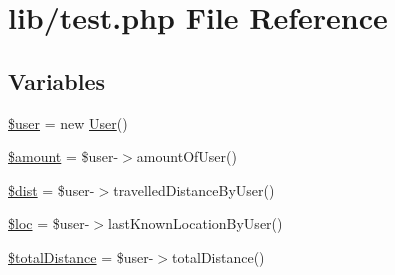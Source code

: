 \hypertarget{test_8php}{\section{lib/test.php File Reference}
\label{test_8php}
}
\subsection*{Variables}
\begin{DoxyCompactItemize}
\item 
\hyperlink{test_8php_a598ca4e71b15a1313ec95f0df1027ca5}{\$user} = new \hyperlink{class_user}{User}()
\item 
\hyperlink{test_8php_af48fe050f529b6ca56356299183b7778}{\$amount} = \$user-\/$>$amount\-Of\-User()
\item 
\hyperlink{test_8php_a2c65ce87b20f770bf48c5f6c585ec4a5}{\$dist} = \$user-\/$>$travelled\-Distance\-By\-User()
\item 
\hyperlink{test_8php_a5b64ac9a38b866d891fcb47ca45c0b3d}{\$loc} = \$user-\/$>$last\-Known\-Location\-By\-User()
\item 
\hyperlink{test_8php_aecf4f5c7feb86dbfd706f9eac2f9741a}{\$total\-Distance} = \$user-\/$>$total\-Distance()
\end{DoxyCompactItemize}


